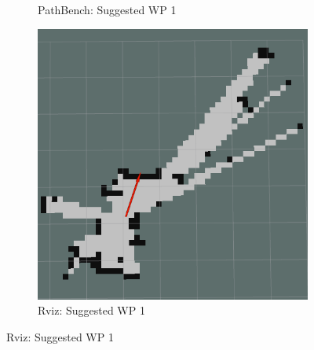 \begin{figure}[h!]
\begin{subfigure}[b]{0.32\linewidth}
     \caption{PathBench: Suggested WP 1}
  \end{subfigure}
  \hfill
  \begin{subfigure}[b]{0.32\linewidth}
    \includegraphics[width=\linewidth]{images/real/sys/1_3.png}
     \caption{Rviz: Suggested WP 1}
  \end{subfigure}
  
  \newline
  

\end{figure}

